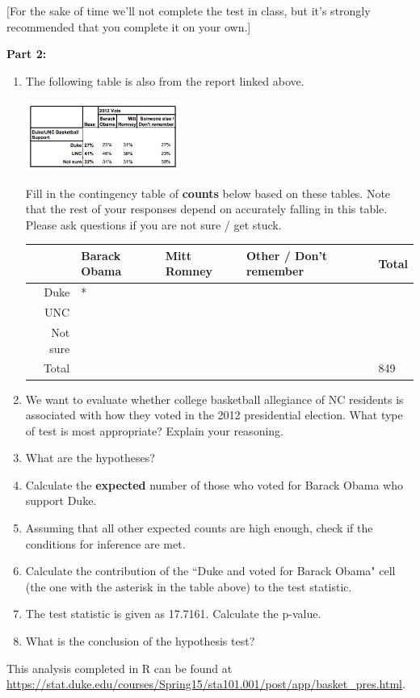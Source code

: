 \documentclass[11pt]{article}
\begin{document}
[For the sake of time we'll not complete the test in class, but it's strongly recommended that you complete it on your own.]

\textbf{Part 2:}

\begin{enumerate}[resume]

\item The following table is also from the report linked above. 

\begin{center}
\includegraphics[width=0.4\textwidth]{pp_basket_pres}
\end{center}

Fill in the contingency table of \textbf{counts} below based on these tables. Note that the rest of your responses depend on accurately falling in this table. Please ask questions if you are not sure / get stuck. %

\begin{center}
\begin{tabular}{r | l | l | l | l}
				& Barack Obama	& Mitt Romney	& Other / Don't remember	& Total \\
\hline
\hline
Duke			& *				& 			&					&  \\
\hline
UNC				& 				& 			& 					&  \\
\hline
Not sure			& 				& 			& 					&  \\
\hline
\hline
Total				& 				& 			& 					& 849 \\
\end{tabular}
\end{center}

\item We want to evaluate whether college basketball allegiance of NC residents is associated with how they voted in the 2012 presidential election. What type of test is most appropriate? Explain your reasoning.

\item What are the hypotheses?

\item Calculate the \textbf{expected} number of those who voted for Barack Obama who support Duke.

\item Assuming that all other expected counts are high enough, check if the conditions for inference are met.

\item Calculate the contribution of the ``Duke and voted for Barack Obama" cell (the one with the asterisk in the table above) to the test statistic.

\item The test statistic is given as 17.7161. Calculate the p-value.

\item What is the conclusion of the hypothesis test?

\end{enumerate}

This analysis completed in R can be found at \url{https://stat.duke.edu/courses/Spring15/sta101.001/post/app/basket_pres.html}.

%
\end{document}
